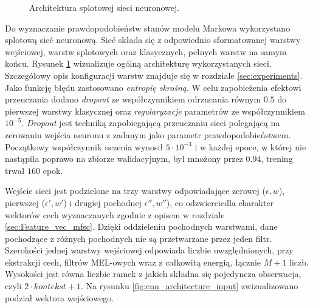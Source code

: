 \documentclass[shortabstract, mgr]{iithesis}
\begin{document}
\begin{figure}[H]
		\label{fig:cnn_architecture_1}
		\caption{Architektura splotowej sieci neuronowej.}
	\end{figure}

	Do wyznaczanie prawdopodobieństw stanów modelu Markowa wykorzystano splotową sieć neuronową. Sieć składa się z odpowiednio sformatowanej warstwy wejściowej, warstw splotowych oraz klasycznych, pełnych warstw na samym końcu. Rysunek \ref{fig:cnn_architecture_1} wizualizuje ogólną architekturę wykorzystanych sieci. Szczegółowy opis konfiguracji warstw znajduje się w rozdziale \ref{sec:experiments}. Jako funkcję błędu zastosowano \textit{entropię skrośną}. W celu zapobieżenia efektowi przeuczania dodano \textit{dropout} ze współczynnikiem odrzucania równym $0.5$ do pierwszej warstwy klasycznej oraz \textit{regularyzacje} parametrów ze współczynnikiem $10^{-5}$. \textit{Dropout} jest techniką zapobiegającą przeuczaniu sieci polegającą na zerowaniu wejścia neuronu z zadanym jako parametr prawdopodobieństwem. Początkowy współczynnik uczenia wynosił $5 \cdot 10^{-3}$ i w każdej epoce, w której nie nastąpiła poprawo na zbiorze walidacyjnym, był mnożony przez $0.94$, trening trwał $160$ epok.
	
	Wejście sieci jest podzielone na trzy warstwy odpowiadające zerowej ($\epsilon, w$), pierwszej ($\epsilon', w'$) i drugiej pochodnej $\epsilon'', w''$), co odzwierciedla charakter wektorów cech wyznaczanych zgodnie z opisem w rozdziale \ref{sec:Feature_vec_mfsc}. Dzięki oddzieleniu pochodnych warstwami, dane pochodzące z różnych pochodnych nie są przetwarzane przez jeden filtr. Szerokości jednej warstwy wejściowej odpowiada liczbie uwzględnionych, przy ekstrakcji cech, filtrów MEL-owych wraz z całkowitą energią, łącznie $M+1$ liczb. Wysokości jest równa liczbie ramek z jakich składna się pojedyncza obserwacja, czyli $2\cdot kontekst + 1$. Na rysunku \ref{fig:cnn_architecture_input} zwizualizowano podział wektora wejściowego. 
	
\end{document}
